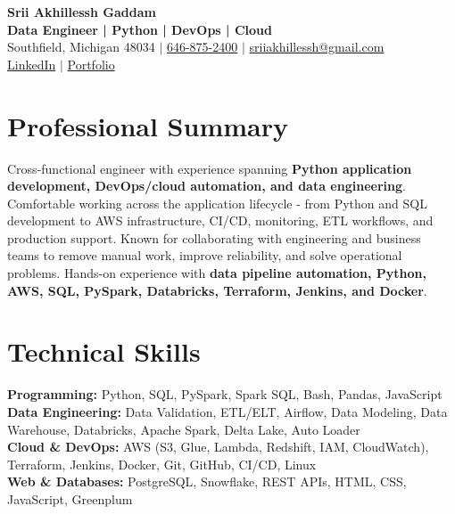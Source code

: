 \documentclass[letterpaper,10pt]{article}
\begin{document}
\fontsize{9.35pt}{10.45pt}\selectfont

\begin{center}
    {\LARGE \textbf{Srii Akhillessh Gaddam}} \\[-1pt]
    \textbf{Data Engineer | Python | DevOps | Cloud} \\[2pt]
    Southfield, Michigan 48034 $|$
    \href{tel:6468752400}{646-875-2400} $|$
    \href{mailto:sriiakhillessh@gmail.com}{sriiakhillessh@gmail.com} \\[1pt]
    \href{https://www.linkedin.com/in/srii-akhiilessh-gaddam-b48668191/}{LinkedIn} $|$
    \href{https://sriiakhillesshg.github.io/portfolio/}{Portfolio}
\end{center}
\vspace{-8pt}

\section{Professional Summary}
\small{Cross-functional engineer with experience spanning \textbf{Python application development, DevOps/cloud automation, and data engineering}. Comfortable working across the application lifecycle - from Python and SQL development to AWS infrastructure, CI/CD, monitoring, ETL workflows, and production support. Known for collaborating with engineering and business teams to remove manual work, improve reliability, and solve operational problems. Hands-on experience with \textbf{data pipeline automation, Python, AWS, SQL, PySpark, Databricks, Terraform, Jenkins, and Docker}.}

\section{Technical Skills}
\small{
\textbf{Programming:} Python, SQL, PySpark, Spark SQL, Bash, Pandas, JavaScript \\
\textbf{Data Engineering:} Data Validation, ETL/ELT, Airflow, Data Modeling, Data Warehouse, Databricks, Apache Spark, Delta Lake, Auto Loader \\
\textbf{Cloud \& DevOps:} AWS (S3, Glue, Lambda, Redshift, IAM, CloudWatch), Terraform, Jenkins, Docker, Git, GitHub, CI/CD, Linux \\
\textbf{Web \& Databases:} PostgreSQL, Snowflake, REST APIs, HTML, CSS, JavaScript, Greenplum
}
\end{document}

